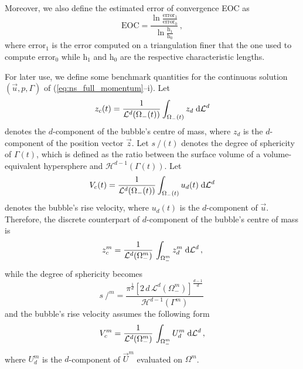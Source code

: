 \documentclass[a4paper,12pt,onecolumn]{article}
\newcommand{\vol}{\mathcal{L}^d}
\newcommand{\surfvol}{\mathcal{H}^{d-1}}
\newcommand{\dL}[1]{\;{\rm d}{\cal L}^{#1}} %
\newcommand{\strikes}{\mbox{$s\!\!\!\!\:/$}}
\begin{document}
Moreover, we also define the estimated error of convergence EOC as
\begin{equation} \label{eq:eoc}
\mbox{EOC}=\frac{\ln{\frac{\mbox{error}_1}{\mbox{error}_0}}}
{\ln{\frac{\mbox{h}_1}{\mbox{h}_0}}}\,,
\end{equation}
where $\mbox{error}_1$ is the error computed on a triangulation finer that the
one used to compute $\mbox{error}_0$ while $\mbox{h}_1$ and $\mbox{h}_0$ are the
respective characteristic lengths.

For later use, we define some benchmark quantities for the continuous
solution $(\vec u, p, \Gamma)$ of (\ref{eq:ns_full_momentum}--i). Let
\begin{equation}
z_c(t) = \frac{1}{\vol(\Omega_-(t))}\int_{\Omega_-(t)} z_d \dL{d}
\end{equation}
denotes the $d$-component of the bubble's centre of mass, where $z_d$ is the
$d$-component of the position vector $\vec z$. Let $\strikes(t)$ denotes the
degree of sphericity of $\Gamma(t)$, which is defined as the ratio between the
surface volume of a volume-equivalent hypersphere and $\surfvol(\Gamma(t))$. Let
\begin{equation}
V_c(t) = \frac{1}{\vol(\Omega_-(t))}\int_{\Omega_-(t)} u_d(t) \dL{d}
\end{equation}
denotes the bubble's rise velocity, where $u_d(t)$ is the $d$-component of
$\vec u$. Therefore, the discrete counterpart of $d$-component of the bubble's
centre of mass is
\begin{equation}
z_c^m = \frac{1}{\vol(\Omega_-^m)}\,\int_{\Omega_-^m} z_d^{m} \dL{d}\,,
\end{equation}
while the degree of sphericity becomes
\begin{equation}
\strikes^m =\frac{\pi^{\frac{1}{d}}[2\,d\,\vol(\Omega_-^m)]^\frac{d-1}{d}}
{\surfvol(\Gamma^m)}\,
\end{equation}
and the bubble's rise velocity assumes the following form
\begin{equation}
V^m_c = \frac{1}{\vol(\Omega_-^m)}\,\int_{\Omega_-^m}U^m_d\dL{d}\,,
\end{equation}
where $U^m_d$ is the $d$-component of $\vec U^m$ evaluated on $\Omega^m$.
\end{document}
